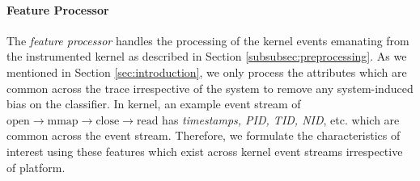 \paragraph{Feature Processor}
\label{subsec:process-stage1}
The \emph{feature processor} handles the processing of 
the kernel events emanating from the instrumented kernel as described in 
Section \ref{subsubsec:preprocessing}. As we mentioned in 
Section \ref{sec:introduction}, we only process the attributes which are common 
across the trace irrespective of the system to remove any system-induced bias 
on the classifier. In kernel, an 
example event stream of $\text{open} \longrightarrow \text{mmap} 
\longrightarrow \text{close} \longrightarrow \text{read}$ has 
\emph{timestamps, PID, TID, NID}, etc. which are common across the event 
stream. Therefore, we formulate the characteristics of interest using these 
features which exist across kernel event streams irrespective of platform. 


